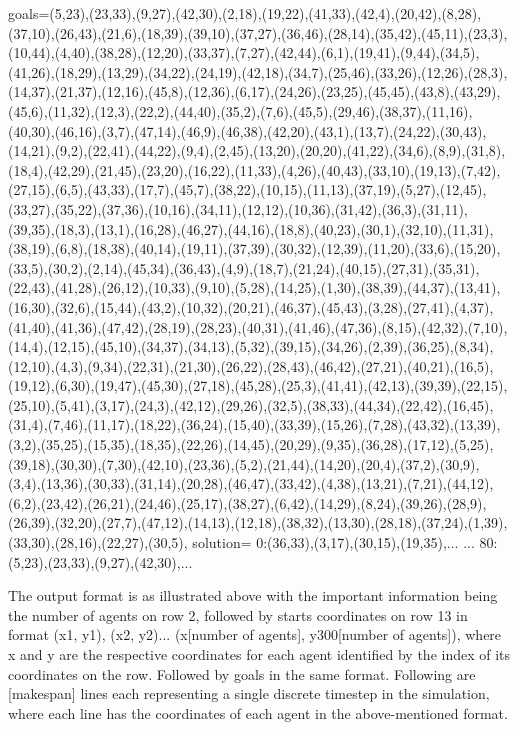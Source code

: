 goals=(5,23),(23,33),(9,27),(42,30),(2,18),(19,22),(41,33),(42,4),(20,42),(8,28),(37,10),(26,43),(21,6),(18,39),(39,10),(37,27),(36,46),(28,14),(35,42),(45,11),(23,3),(10,44),(4,40),(38,28),(12,20),(33,37),(7,27),(42,44),(6,1),(19,41),(9,44),(34,5),(41,26),(18,29),(13,29),(34,22),(24,19),(42,18),(34,7),(25,46),(33,26),(12,26),(28,3),(14,37),(21,37),(12,16),(45,8),(12,36),(6,17),(24,26),(23,25),(45,45),(43,8),(43,29),(45,6),(11,32),(12,3),(22,2),(44,40),(35,2),(7,6),(45,5),(29,46),(38,37),(11,16),(40,30),(46,16),(3,7),(47,14),(46,9),(46,38),(42,20),(43,1),(13,7),(24,22),(30,43),(14,21),(9,2),(22,41),(44,22),(9,4),(2,45),(13,20),(20,20),(41,22),(34,6),(8,9),(31,8),(18,4),(42,29),(21,45),(23,20),(16,22),(11,33),(4,26),(40,43),(33,10),(19,13),(7,42),(27,15),(6,5),(43,33),(17,7),(45,7),(38,22),(10,15),(11,13),(37,19),(5,27),(12,45),(33,27),(35,22),(37,36),(10,16),(34,11),(12,12),(10,36),(31,42),(36,3),(31,11),(39,35),(18,3),(13,1),(16,28),(46,27),(44,16),(18,8),(40,23),(30,1),(32,10),(11,31),(38,19),(6,8),(18,38),(40,14),(19,11),(37,39),(30,32),(12,39),(11,20),(33,6),(15,20),(33,5),(30,2),(2,14),(45,34),(36,43),(4,9),(18,7),(21,24),(40,15),(27,31),(35,31),(22,43),(41,28),(26,12),(10,33),(9,10),(5,28),(14,25),(1,30),(38,39),(44,37),(13,41),(16,30),(32,6),(15,44),(43,2),(10,32),(20,21),(46,37),(45,43),(3,28),(27,41),(4,37),(41,40),(41,36),(47,42),(28,19),(28,23),(40,31),(41,46),(47,36),(8,15),(42,32),(7,10),(14,4),(12,15),(45,10),(34,37),(34,13),(5,32),(39,15),(34,26),(2,39),(36,25),(8,34),(12,10),(4,3),(9,34),(22,31),(21,30),(26,22),(28,43),(46,42),(27,21),(40,21),(16,5),(19,12),(6,30),(19,47),(45,30),(27,18),(45,28),(25,3),(41,41),(42,13),(39,39),(22,15),(25,10),(5,41),(3,17),(24,3),(42,12),(29,26),(32,5),(38,33),(44,34),(22,42),(16,45),(31,4),(7,46),(11,17),(18,22),(36,24),(15,40),(33,39),(15,26),(7,28),(43,32),(13,39),(3,2),(35,25),(15,35),(18,35),(22,26),(14,45),(20,29),(9,35),(36,28),(17,12),(5,25),(39,18),(30,30),(7,30),(42,10),(23,36),(5,2),(21,44),(14,20),(20,4),(37,2),(30,9),(3,4),(13,36),(30,33),(31,14),(20,28),(46,47),(33,42),(4,38),(13,21),(7,21),(44,12),(6,2),(23,42),(26,21),(24,46),(25,17),(38,27),(6,42),(14,29),(8,24),(39,26),(28,9),(26,39),(32,20),(27,7),(47,12),(14,13),(12,18),(38,32),(13,30),(28,18),(37,24),(1,39),(33,30),(28,16),(22,27),(30,5),
solution=
0:(36,33),(3,17),(30,15),(19,35),...
...
80:(5,23),(23,33),(9,27),(42,30),...


\endtt
The output format is as illustrated above with the important information being the number of agents on row 2, followed by starts coordinates on row 13 in format (x1, y1), (x2, y2)... (x[number of agents], y300[number of agents]),  where x and y are the respective coordinates for each agent identified by the index of its coordinates on the row. Followed by goals in the same format. Following are [makespan] lines each representing a single discrete timestep in the simulation, where each line has the coordinates of each agent in the above-mentioned format.

